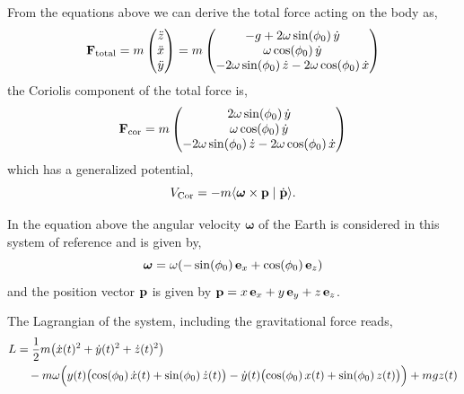 \documentclass[12pt]{article}
\newcommand{\ip}[2]{\langle #1 \mid #2 \rangle}
\begin{document}
From the equations above we can derive the total force acting on the body as,
\begin{equation}
  \vb{F}_\text{total} = m
  \begin{pmatrix} \ddot{z} \\ \ddot{x} \\ \ddot{y} \end{pmatrix}
  = m
  \begin{pmatrix}
    -g + 2\omega\sin(\phi_0)\,\dot{y} \\
    \omega\cos(\phi_0)\,\dot{y} \\
    -2\omega\sin(\phi_0)\,\dot{z} - 2\omega\cos(\phi_0)\,\dot{x}
  \end{pmatrix}
\end{equation}
the Coriolis component of the total force is,
\begin{equation}
  \vb{F}_\text{cor} = m
  \begin{pmatrix}
    2\omega\sin(\phi_0)\,\dot{y} \\
    \omega\cos(\phi_0)\,\dot{y} \\
    -2\omega\sin(\phi_0)\,\dot{z} - 2\omega\cos(\phi_0)\,\dot{x}
  \end{pmatrix}
\end{equation}
which has a generalized potential,
\begin{equation}
  V_\text{Cor} = -m\ip{\boldsymbol{\omega}\times\vb{p}}{\dot{\vb{p}}}.
\end{equation}

In the equation above the angular velocity $\boldsymbol{\omega}$ of the Earth is considered
in this system of reference and is given by,
\begin{equation}
  \boldsymbol{\omega} = \omega(-\sin(\phi_0)\,\vb{e}_x + \cos(\phi_0)\,\vb{e}_z)
\end{equation}
and the position vector $\vb{p}$ is given by $\vb{p} = x\,\vb{e}_x + y\,\vb{e}_y + z\,\vb{e}_z$.

The Lagrangian of the system, including the gravitational force reads,
\begin{equation}
  \begin{aligned}
    L &= \frac{1}{2}m\bigl(\dot{x}(t)^2 + \dot{y}(t)^2 + \dot{z}(t)^2\bigr) \\
      &\quad - m\omega\Bigl(y(t)\bigl(\cos(\phi_0)\,\dot{x}(t) + \sin(\phi_0)\,\dot{z}(t)\bigr)
        - \dot{y}(t)\bigl(\cos(\phi_0)\,x(t) + \sin(\phi_0)\,z(t)\bigr)\Bigr) + mgz(t)
  \end{aligned}
\end{equation}
\end{document}
